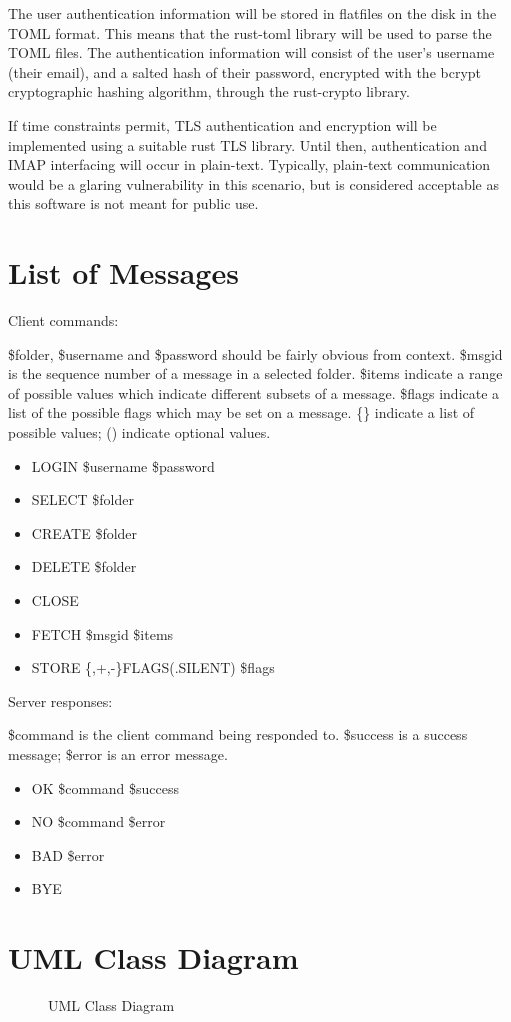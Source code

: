 \documentclass[a4paper,12pt]{article}
\begin{document}
The user authentication information will be stored in flatfiles on the disk in the TOML format. This means that the rust-toml library will be used to parse the TOML files. The authentication information will consist of the user's username (their email), and a salted hash of their password, encrypted with the bcrypt cryptographic hashing algorithm, through the rust-crypto library.

If time constraints permit, TLS authentication and encryption will be implemented using a suitable rust TLS library. Until then, authentication and IMAP interfacing will occur in plain-text. Typically, plain-text communication would be a glaring vulnerability in this scenario, but is considered acceptable as this software is not meant for public use.

\section*{List of Messages}

Client commands:

\$folder, \$username and \$password should be fairly obvious from context. \$msgid is the sequence number of a message in a selected folder. \$items indicate a range of possible values which indicate different subsets of a message. \$flags indicate a list of the possible flags which may be set on a message. \{\} indicate a list of possible values; () indicate optional values.

\begin{itemize}
\item LOGIN \$username \$password
\item SELECT \$folder
\item CREATE \$folder
\item DELETE \$folder
\item CLOSE
\item FETCH \$msgid \$items
\item STORE \{,+,-\}FLAGS(.SILENT) \$flags
\end{itemize}

Server responses:

\$command is the client command being responded to. \$success is a success message; \$error is an error message.

\begin{itemize}
\item OK \$command \$success
\item NO \$command \$error
\item BAD \$error
\item BYE
\end{itemize}

\section*{UML Class Diagram}

\begin{figure}[h]
    \centering
    
    \caption{UML Class Diagram}
\end{figure}
\end{document}
